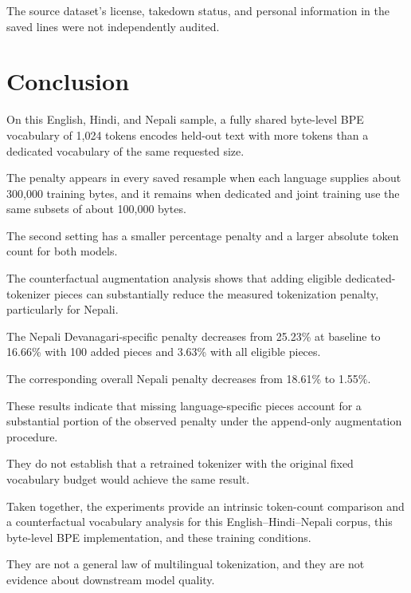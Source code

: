 \documentclass[10pt,twocolumn]{article}
\begin{document}
The source dataset's license, takedown status, and
personal information in the saved lines were not
independently audited.


\section{Conclusion}

On this English, Hindi, and Nepali sample, a fully
shared byte-level BPE vocabulary of 1,024 tokens
encodes held-out text with more tokens than a dedicated
vocabulary of the same requested size.

The penalty appears in every saved resample when
each language supplies about 300,000 training bytes,
and it remains when dedicated and joint training use
the same subsets of about 100,000 bytes.

The second setting has a smaller percentage penalty
and a larger absolute token count for both models.

The counterfactual augmentation analysis shows that
adding eligible dedicated-tokenizer pieces can
substantially reduce the measured tokenization penalty,
particularly for Nepali.

The Nepali Devanagari-specific penalty decreases
from 25.23\% at baseline to 16.66\% with 100 added
pieces and 3.63\% with all eligible pieces.

The corresponding overall Nepali penalty decreases
from 18.61\% to 1.55\%.

These results indicate that missing language-specific
pieces account for a substantial portion of the observed
penalty under the append-only augmentation procedure.

They do not establish that a retrained tokenizer with
the original fixed vocabulary budget would achieve
the same result.

Taken together, the experiments provide an intrinsic
token-count comparison and a counterfactual vocabulary
analysis for this English--Hindi--Nepali corpus,
this byte-level BPE implementation, and these
training conditions.

They are not a general law of multilingual tokenization,
and they are not evidence about downstream model quality.

\end{document}
